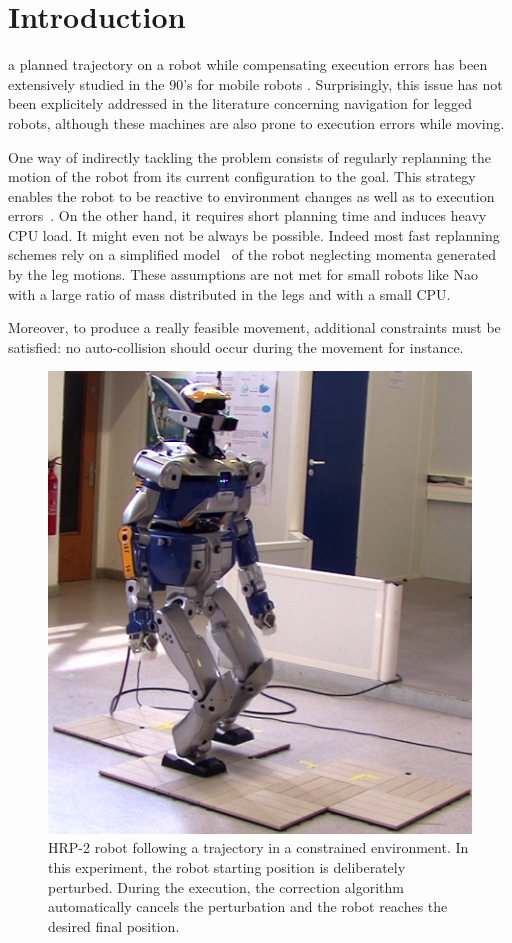 \section{Introduction}

 a planned trajectory on a robot while
compensating execution errors has been extensively studied in the 90's
for mobile robots \cite{91icra.samson,
  98deLucaOrioloSamson}. Surprisingly, this issue has not been
explicitely addressed in the literature concerning navigation for
legged robots, although these machines are also prone to execution
errors while moving.

One way of indirectly tackling the problem consists of regularly
replanning the motion of the robot from its current configuration to
the goal. This strategy enables the robot to be reactive to
environment changes as well as to execution
errors~\cite{05humanoids.michel,
  06icra.MichelChestnut,10springer.chestnut}. On the other hand, it
requires short planning time and induces heavy CPU load. It might even
not be always be possible. Indeed most fast replanning schemes rely on
a simplified model~\cite{01icra.KajitaKanehiro} of the robot
neglecting momenta generated by the leg motions. These assumptions are
not met for small robots like Nao~\cite{wikipedia.nao} with a large
ratio of mass distributed in the legs and with a small CPU.

Moreover, to produce a really feasible movement, additional
constraints must be satisfied: no auto-collision should occur during
the movement for instance.


\begin{figure}[ht!]
  \begin{center}
    \includegraphics[width=.45\textwidth]{fig/exp.png}
  \end{center}
  \caption{HRP-2 robot following a trajectory in a constrained
    environment. In this experiment, the robot starting position is
    deliberately perturbed. During the execution, the correction algorithm
    automatically cancels the perturbation and the robot reaches the
    desired final position. \label{fig:following}}
\end{figure}



